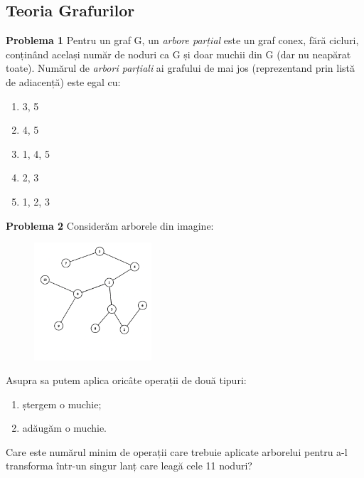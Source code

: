 \documentclass[11pt, a4paper]{article}
\begin{document}
\newpage
\subsection{Teoria Grafurilor}
\textbf{Problema 1}\newline
Pentru un graf G, un \textit{arbore parțial} este un graf conex, fără cicluri, conținând același număr de noduri ca G și doar muchii din G (dar nu neapărat toate).
Numărul de \textit{arbori parțiali} ai grafului de mai jos (reprezentand prin listă de adiacență) este egal cu:
\begin{enumerate}
    \item {3, 5}
    \item {4, 5}
    \item {1, 4, 5}
    \item {2, 3}
    \item {1, 2, 3}
\end{enumerate}

\textbf{Problema 2}\newline
Considerăm arborele din imagine:
\begin{figure}[htbp]
    \centering
    \includegraphics[width=0.39\textwidth]{graph.png}
\end{figure}
Asupra sa putem aplica oricâte operații de două tipuri:
\begin{enumerate}
    \item ștergem o muchie;
    \item adăugăm o muchie.
\end{enumerate}
Care este numărul minim de operații care trebuie aplicate arborelui pentru a-l transforma într-un singur lanț care leagă cele 11 noduri?





\end{document}
